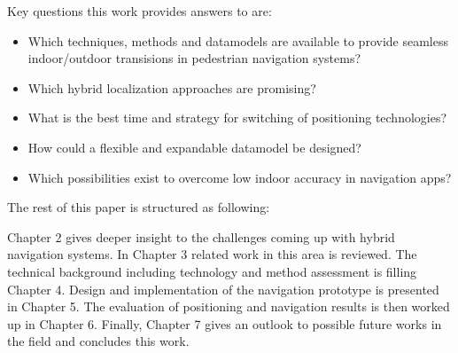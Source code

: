 Key questions this work provides answers to are:
\begin{itemize}
	\item Which techniques, methods and datamodels are available to provide seamless indoor/outdoor transisions in pedestrian navigation systems?
	\item Which hybrid localization approaches are promising?
	\item What is the best time and strategy for switching of positioning technologies?
	\item How could a flexible and expandable datamodel be designed?
	\item Which possibilities exist to overcome low indoor accuracy in navigation apps?
\end{itemize}

The rest of this paper is structured as following:

Chapter 2 gives deeper insight to the challenges coming up with hybrid navigation systems. In Chapter 3 related work in this area is reviewed. The technical background including technology and method assessment is filling Chapter 4. Design and implementation of the navigation prototype is presented in Chapter 5. The evaluation of positioning and navigation results is then worked up in Chapter 6. Finally, Chapter 7 gives an outlook to possible future works in the field and concludes this work.


